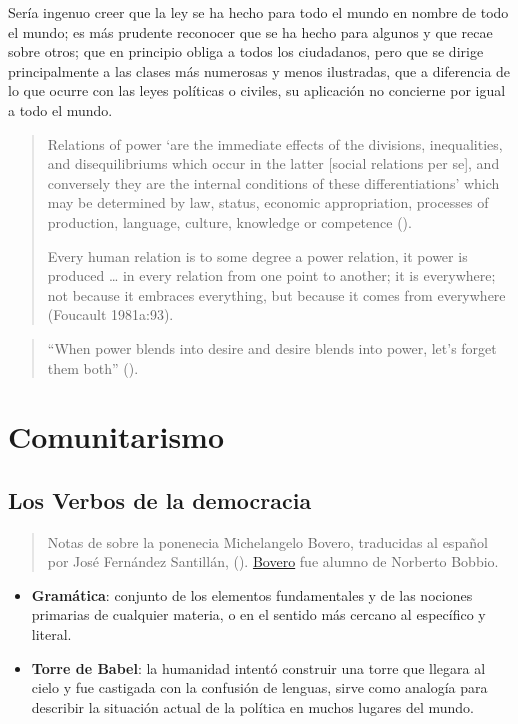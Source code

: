 \documentclass[
  letterpaper,
  DIV=11,
  numbers=noendperiod]{scrreprt}
\begin{document}
Sería ingenuo creer que la ley se ha hecho para todo el mundo en nombre
de todo el mundo; es más prudente reconocer que se ha hecho para algunos
y que recae sobre otros; que en principio obliga a todos los ciudadanos,
pero que se dirige principalmente a las clases más numerosas y menos
ilustradas, que a diferencia de lo que ocurre con las leyes políticas o
civiles, su aplicación no concierne por igual a todo el mundo.

\begin{quote}
Relations of power `are the immediate effects of the divisions,
inequalities, and disequilibriums which occur in the latter {[}social
relations per se{]}, and conversely they are the internal conditions of
these differentiations' which may be determined by law, status, economic
appropriation, processes of production, language, culture, knowledge or
competence ().

Every human relation is to some degree a power relation, it power is
produced \ldots{} in every relation from one point to another; it is
everywhere; not because it embraces everything, but because it comes
from everywhere (Foucault 1981a:93).
\end{quote}

\begin{quote}
``When power blends into desire and desire blends into power, let's
forget them both'' ().
\end{quote}

\chapter{Comunitarismo}\label{comunitarismo}

\section{Los Verbos de la democracia}\label{los-verbos-de-la-democracia}

\begin{quote}
Notas de sobre la ponenecia Michelangelo Bovero, traducidas al español
por José Fernández Santillán, ().
\href{https://www.eld.edu.mx/michelangelo-bovero-3/}{Bovero} fue alumno
de Norberto Bobbio.
\end{quote}

\begin{itemize}
\item
  \textbf{Gramática}: conjunto de los elementos fundamentales y de las
  nociones primarias de cualquier materia, o en el sentido más cercano
  al específico y literal.
\item
  \textbf{Torre de Babel}: la humanidad intentó construir una torre que
  llegara al cielo y fue castigada con la confusión de lenguas, sirve
  como analogía para describir la situación actual de la política en
  muchos lugares del mundo.
\end{itemize}
\end{document}
